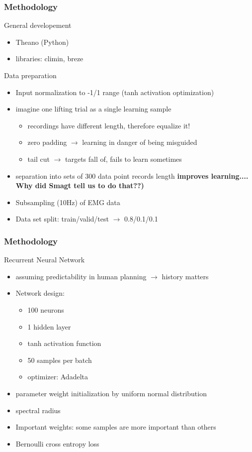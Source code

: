 \documentclass{beamer}
\begin{document}
\begin{frame}
\frametitle{Methodology}
General developement
\begin{itemize}
    \item Theano (Python)
    \item libraries: climin, breze
\end{itemize}

Data preparation
\begin{itemize}
    \item Input normalization to -1/1 range (tanh activation optimization)
    \item imagine one lifting trial as a single learning sample
    \begin{itemize}
        \item recordings have different length, therefore equalize it!
        \item zero padding $\rightarrow$ learning in danger of being misguided
        \item tail cut $\rightarrow$ targets fall of, fails to learn sometimes
    \end{itemize}
    \item separation into sets of 300 data point records length \textbf{improves learning.... Why did Smagt tell us to do that??)}
   	\item Subsampling (10Hz) of EMG data
   	\item Data set split: train/valid/test $\rightarrow$ 0.8/0.1/0.1
\end{itemize}
\end{frame}

\begin{frame}
\frametitle{Methodology}
Recurrent Neural Network
\begin{itemize}
    \item assuming predictability in human planning $\rightarrow$ history matters
    \item Network design:
    \begin{itemize}
        \item 100 neurons
        \item 1 hidden layer
        \item tanh activation function
        \item 50 samples per batch
        \item optimizer: Adadelta
    \end{itemize}
    \item parameter weight initialization by uniform normal distribution
    \item spectral radius
    \item Important weights: some samples are more important than others
    \item Bernoulli cross entropy loss%
\end{itemize}
\end{frame}
\end{document}
